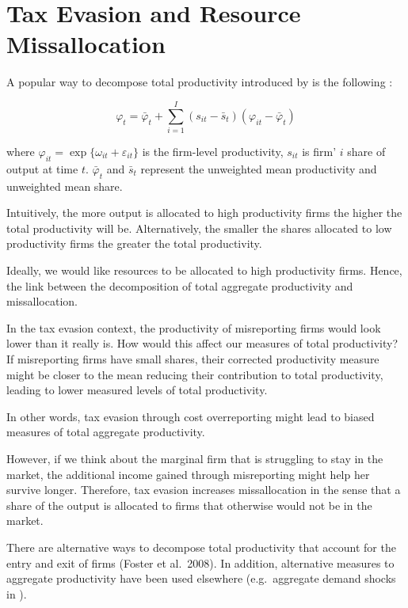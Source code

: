 \documentclass[
  12pt]{article}
\theoremstyle{definition}
\theoremstyle{remark}
\begin{document}
\section{Tax Evasion and Resource
Missallocation}\label{tax-evasion-and-resource-missallocation}

A popular way to decompose total productivity introduced by
\citet{Olley1996} is the following :

\[
\varphi_t = \bar\varphi_t + \sum_{i=1}^I \left(s_{it}-\bar s_{t}\right)\left(\varphi_{it}-\bar\varphi_t\right)
\]

where \(\varphi_{it}=\exp\{\omega_{it}+\varepsilon_{it}\}\) is the
firm-level productivity, \(s_{it}\) is firm' \(i\) share of output at
time \(t\). \(\bar\varphi_t\) and \(\bar s_t\) represent the unweighted
mean productivity and unweighted mean share.

Intuitively, the more output is allocated to high productivity firms the
higher the total productivity will be. Alternatively, the smaller the
shares allocated to low productivity firms the greater the total
productivity.

Ideally, we would like resources to be allocated to high productivity
firms. Hence, the link between the decomposition of total aggregate
productivity and missallocation.

In the tax evasion context, the productivity of misreporting firms would
look lower than it really is. How would this affect our measures of
total productivity? If misreporting firms have small shares, their
corrected productivity measure might be closer to the mean reducing
their contribution to total productivity, leading to lower measured
levels of total productivity.

In other words, tax evasion through cost overreporting might lead to
biased measures of total aggregate productivity.

However, if we think about the marginal firm that is struggling to stay
in the market, the additional income gained through misreporting might
help her survive longer. Therefore, tax evasion increases missallocation
in the sense that a share of the output is allocated to firms that
otherwise would not be in the market.

There are alternative ways to decompose total productivity that account
for the entry and exit of firms (Foster et al.~2008). In addition,
alternative measures to aggregate productivity have been used elsewhere
(e.g.~aggregate demand shocks in \citet{Eslava2004}).
\end{document}

